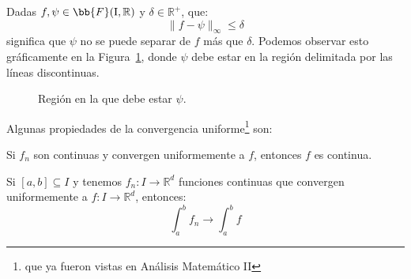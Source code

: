 \begin{ejemplo}
    Dadas $f,\psi \in \bb{F}(\text{I},\mathbb{R})$ y $\delta\in \mathbb{R}^+$, que:
    \begin{equation*}
        \|f-\psi\|_\infty \leq \delta
    \end{equation*}
    significa que $\psi$ no se puede separar de $f$ más que $\delta$. Podemos observar esto gráficamente en la Figura~\ref{fig:conv_unif}, donde $\psi$ debe estar en la región delimitada por las líneas discontinuas.
    \begin{figure}[H]
        \centering
        \caption{Región en la que debe estar $\psi$.}
        \label{fig:conv_unif}
    \end{figure}

\end{ejemplo}

\noindent
Algunas propiedades de la convergencia uniforme\footnote{que ya fueron vistas en Análisis Matemático II} son:
\begin{prop}
    Si $f_n$ son continuas y convergen uniformemente a $f$, entonces $f$ es continua.
\end{prop}

\begin{prop}
    Si $[a,b]\subseteq I$ y tenemos $f_n:I\rightarrow\mathbb{R}^d$ funciones continuas que convergen uniformemente a $f:I\rightarrow\mathbb{R}^d$, entonces:
    \begin{equation*}
        \int_{a}^{b} f_n \rightarrow \int_a^b f
    \end{equation*}
\end{prop}

